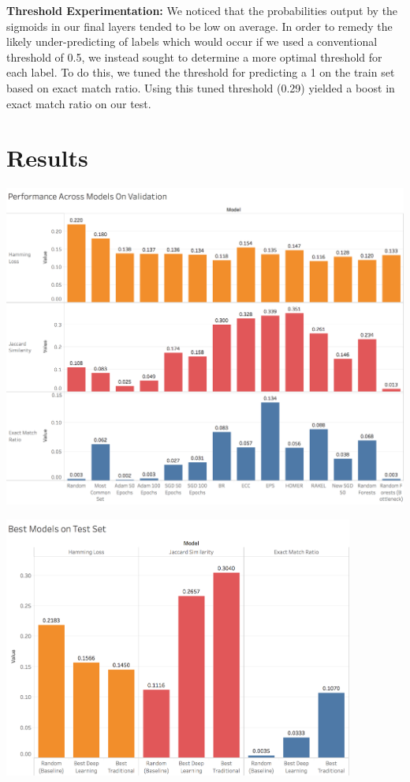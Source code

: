 \documentclass{article}
\begin{document}
        \textbf{Threshold Experimentation:} We noticed that the probabilities output by the sigmoids in our final layers tended to be low on average. In order to remedy the likely under-predicting of labels which would occur if we used a conventional threshold of 0.5, we instead sought to determine a more optimal threshold for each label. To do this, we tuned the threshold for predicting a 1 on the train set based on exact match ratio. Using this tuned threshold (0.29) yielded a boost in exact match ratio on our test.
        

\section{Results}

    \begin{center}
        \includegraphics[width=15.5cm]{Models.png}
    \end{center}
    
        \begin{center}
        \includegraphics[width=11.5cm]{Test.png}
    \end{center}
    
\end{document}
